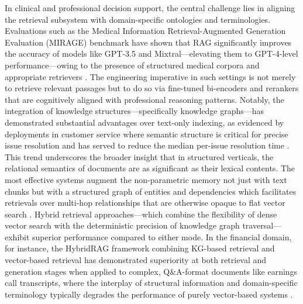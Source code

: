 \documentclass[11pt,a4paper]{article}
\begin{document}
In clinical and professional decision support, the central challenge lies in aligning the retrieval subsystem with domain-specific ontologies and terminologies. Evaluations such as the Medical Information Retrieval-Augmented Generation Evaluation (MIRAGE) benchmark have shown that RAG significantly improves the accuracy of models like GPT-3.5 and Mixtral---elevating them to GPT-4-level performance---owing to the presence of structured medical corpora and appropriate retrievers \cite{arxiv:2402.13178v2}. The engineering imperative in such settings is not merely to retrieve relevant passages but to do so via fine-tuned bi-encoders and rerankers that are cognitively aligned with professional reasoning patterns. Notably, the integration of knowledge structures---specifically knowledge graphs---has demonstrated substantial advantages over text-only indexing, as evidenced by deployments in customer service where semantic structure is critical for precise issue resolution and has served to reduce the median per-issue resolution time \cite{arxiv:2404.17723v2}. This trend underscores the broader insight that in structured verticals, the relational semantics of documents are as significant as their lexical contents. The most effective systems augment the non-parametric memory not just with text chunks but with a structured graph of entities and dependencies which facilitates retrievals over multi-hop relationships that are otherwise opaque to flat vector search \cite{arxiv:2408.08921v2}. Hybrid retrieval approaches---which combine the flexibility of dense vector search with the deterministic precision of knowledge graph traversal---exhibit superior performance compared to either mode. In the financial domain, for instance, the HybridRAG framework combining KG-based retrieval and vector-based retrieval has demonstrated superiority at both retrieval and generation stages when applied to complex, Q\&A-format documents like earnings call transcripts, where the interplay of structural information and domain-specific terminology typically degrades the performance of purely vector-based systems \cite{arxiv:2408.04948v1}.
\end{document}
